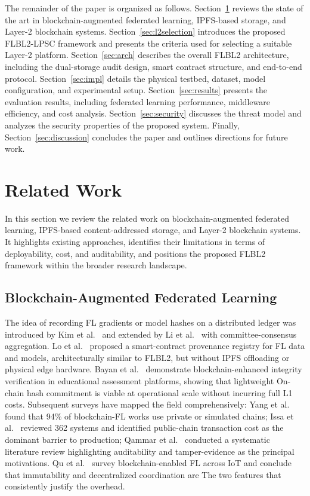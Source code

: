 \documentclass{llncs}
\begin{document}
The remainder of the paper is organized as follows. Section~\ref{sec:related} reviews the state of the art in blockchain-augmented federated learning, IPFS-based storage, and Layer-2 blockchain systems. Section~\ref{sec:l2selection} introduces the proposed FLBL2-LPSC framework and presents the criteria used for selecting a suitable Layer-2 platform. Section~\ref{sec:arch} describes the overall FLBL2 architecture, including the dual-storage audit design, smart contract structure, and end-to-end protocol. Section~\ref{sec:impl} details the physical testbed, dataset, model configuration, and experimental setup. Section~\ref{sec:results} presents the evaluation results, including federated learning performance, middleware efficiency, and cost analysis. Section~\ref{sec:security} discusses the threat model and analyzes the security properties of the proposed system. Finally, Section~\ref{sec:discussion} concludes the paper and outlines directions for future work.


\FloatBarrier
\section{Related Work}
\label{sec:related}
In this section we review the related work on blockchain-augmented federated learning, IPFS-based content-addressed storage, and Layer-2 blockchain systems. It highlights existing approaches, identifies their limitations in terms of deployability, cost, and auditability, and positions the proposed FLBL2 framework within the broader research landscape.

\subsection{Blockchain-Augmented Federated Learning}
The idea of recording FL gradients or model hashes on a distributed ledger
was introduced by Kim et al.~\cite{kim2019blockchained} and extended
by Li et al.~\cite{li2020blockchained} with committee-consensus aggregation.
Lo et al.~\cite{lo2021trustworthy} proposed a smart-contract provenance
registry for FL data and models, architecturally similar to FLBL2, but
without IPFS offloading or physical edge hardware. Bayan et
al.~\cite{bayan2024blockchain} demonstrate blockchain-enhanced integrity
verification in educational assessment platforms, showing that lightweight
On-chain hash commitment is viable at operational scale without incurring
full L1 costs. Subsequent surveys have
mapped the field comprehensively: Yang et al.~\cite{yang2024blockchain} found
that 94\% of blockchain-FL works use private or simulated chains;
Issa et al.~\cite{issa2023survey} reviewed 362 systems and identified
public-chain transaction cost as the dominant barrier to production;
Qammar et al.~\cite{qammar2023securing} conducted a systematic literature
review highlighting auditability and tamper-evidence as the principal
motivations. Qu et al.~\cite{qu2022blockchain} survey blockchain-enabled FL
across IoT and conclude that immutability and decentralized coordination are
The two features that consistently justify the overhead.
\end{document}
